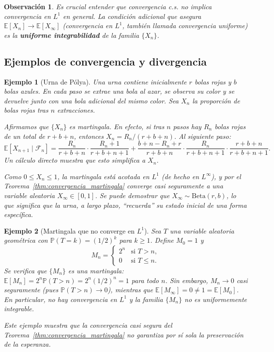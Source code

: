 \documentclass[12pt]{book}
\newtheorem{example}{Ejemplo}[chapter]
\newtheorem{remark}{Observación}[chapter]
\begin{document}
\begin{remark}
    Es crucial entender que convergencia c.s. \emph{no} implica convergencia en $L^1$ en general. La condición adicional que asegura $\mathbb{E}[X_n] \to \mathbb{E}[X_\infty]$ (convergencia en $L^1$, también llamada \emph{convergencia uniforme}) es la \textbf{uniforme integrabilidad} de la familia $\{X_n\}$.
\end{remark}

\subsection{Ejemplos de convergencia y divergencia}

\begin{example}[Urna de Pólya]
\label{ej:polya}
    Una urna contiene inicialmente $r$ bolas rojas y $b$ bolas azules. En cada paso se extrae una bola al azar, se observa su color y se devuelve junto con una bola adicional del mismo color. Sea $X_n$ la \emph{proporción} de bolas rojas tras $n$ extracciones.

    \smallskip
    Afirmamos que $\{X_n\}$ es martingala. En efecto, si tras $n$ pasos hay $R_n$ bolas rojas de un total de $r+b+n$, entonces $X_n = R_n/(r+b+n)$. Al siguiente paso:
    \[
        \mathbb{E}[X_{n+1} \mid \mathcal{F}_n]
        = \frac{R_n}{r+b+n}\cdot\frac{R_n+1}{r+b+n+1} + \frac{b+n-R_n+r}{r+b+n}\cdot\frac{R_n}{r+b+n+1} \cdot\frac{r+b+n}{r+b+n+1}.
    \]
    Un cálculo directo muestra que esto simplifica a $X_n$.

    \smallskip
    Como $0 \le X_n \le 1$, la martingala está acotada en $L^1$ (de hecho en $L^\infty$), y por el Teorema~\ref{thm:convergencia_martingala} converge casi seguramente a una variable aleatoria $X_\infty \in [0,1]$. Se puede demostrar que $X_\infty \sim \mathrm{Beta}(r, b)$, lo que significa que la urna, a largo plazo, ``recuerda'' su estado inicial de una forma específica.
\end{example}

\begin{example}[Martingala que no converge en $L^1$]
\label{ej:no_conv_L1}
    Sea $T$ una variable aleatoria geométrica con $\mathbb{P}(T = k) = (1/2)^k$ para $k \ge 1$. Define $M_0 = 1$ y
    \[
        M_n =
        \begin{cases}
            2^n & \text{si } T > n, \\
            0   & \text{si } T \le n.
        \end{cases}
    \]
    Se verifica que $\{M_n\}$ es una martingala: $\mathbb{E}[M_n] = 2^n \mathbb{P}(T > n) = 2^n (1/2)^n = 1$ para todo $n$. Sin embargo, $M_n \to 0$ casi seguramente (pues $\mathbb{P}(T > n) \to 0$), mientras que $\mathbb{E}[M_\infty] = 0 \ne 1 = \mathbb{E}[M_0]$. En particular, no hay convergencia en $L^1$ y la familia $\{M_n\}$ \emph{no} es uniformemente integrable.

    \smallskip
    Este ejemplo muestra que la convergencia casi segura del Teorema~\ref{thm:convergencia_martingala} no garantiza por sí sola la preservación de la esperanza.
\end{example}
\end{document}
